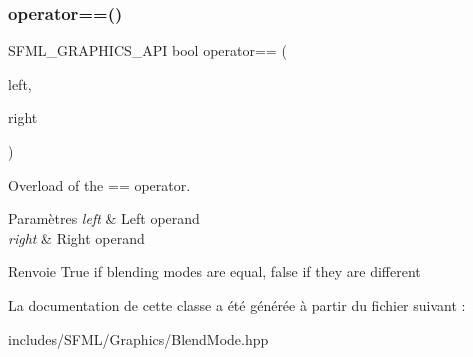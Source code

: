 \subsubsection{\texorpdfstring{operator==()}{operator==()}}
{\footnotesize\ttfamily S\+F\+M\+L\+\_\+\+G\+R\+A\+P\+H\+I\+C\+S\+\_\+\+A\+PI bool operator== (\begin{DoxyParamCaption}\item[{const \hyperlink{structsf_1_1BlendMode}{Blend\+Mode} \&}]{left,  }\item[{const \hyperlink{structsf_1_1BlendMode}{Blend\+Mode} \&}]{right }\end{DoxyParamCaption})\hspace{0.3cm}{\ttfamily [related]}}



Overload of the == operator. 


\begin{DoxyParams}{Paramètres}
{\em left} & Left operand \\
\hline
{\em right} & Right operand\\
\hline
\end{DoxyParams}
\begin{DoxyReturn}{Renvoie}
True if blending modes are equal, false if they are different 
\end{DoxyReturn}


La documentation de cette classe a été générée à partir du fichier suivant \+:\begin{DoxyCompactItemize}
\item 
includes/\+S\+F\+M\+L/\+Graphics/Blend\+Mode.\+hpp\end{DoxyCompactItemize}
